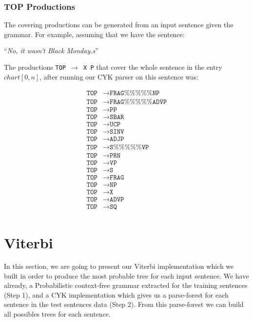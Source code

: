 \documentclass[a4paper,11pt]{article}
\begin{document}
\subsubsection{TOP Productions}
The covering productions can be generated from an input sentence given
the grammar. For example, assuming that we have the sentence:
\begin{center}
``\textit{No, it wasn't Black Monday.s}''
\end{center}
The productions \texttt{TOP $\rightarrow$ X P} that cover the whole sentence in the  entry $chart[0, n]$, after running our CYK parser on this sentence was:
\begin{scriptsize}
\begin{align*}
\texttt{TOP} &\rightarrow \texttt{FRAG\%\%\%\%\%NP} \\
\texttt{TOP} &\rightarrow  \texttt{FRAG\%\%\%\%\%ADVP} \\
\texttt{TOP} &\rightarrow  \texttt{PP} \\
\texttt{TOP} &\rightarrow  \texttt{SBAR} \\
\texttt{TOP}  &\rightarrow \texttt{UCP} \\
\texttt{TOP}  &\rightarrow \texttt{SINV} \\
\texttt{TOP} &\rightarrow  \texttt{ADJP} \\
\texttt{TOP}  &\rightarrow \texttt{S\%\%\%\%\%VP} \\
\texttt{TOP} &\rightarrow  \texttt{PRN} \\
\texttt{TOP}  &\rightarrow \texttt{VP} \\
\texttt{TOP} &\rightarrow  \texttt{S} \\
\texttt{TOP} &\rightarrow  \texttt{FRAG} \\
\texttt{TOP} &\rightarrow  \texttt{NP} \\
\texttt{TOP}  &\rightarrow \texttt{X} \\
\texttt{TOP}  &\rightarrow \texttt{ADVP} \\
\texttt{TOP} &\rightarrow  \texttt{SQ} \\
\end{align*}

\end{scriptsize}

\section{Viterbi}
\label{viterbi}
In this section, we are going to present our Viterbi implementation which we built in order to produce the most probable tree for each input sentence. We have already, a Probabilistic context-free grammar extracted for the training sentences (Step 1), and a CYK implementation which gives us a parse-forest for each sentence in the test sentences data (Step 2). From this parse-forest we can build all possibles trees for each sentence.
\end{document}
